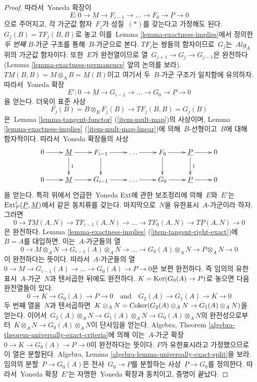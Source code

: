 \begin{proof}
\medskip\noindent
따라서\  Yoneda 확장이
$$
E : 0 \to \underline{M} \to F_{i - 1} \to \ldots \to
F_0 \to \underline{P} \to 0
$$
으로 주어지고, 각 가군값 함자\  $F_j$가 성질\  $(*)$를 갖는다고
가정해도 된다. $G_j(B) = TF_j(B, B)$로 놓고 이를\  Lemma
\ref{lemma-exactness-implies}에서 정의한 {\it 두 번째} $B$-가군 구조를
통해\  $B$-가군으로 본다. $TF_j$는 쌍들의 함자이므로\  $G_j$는\ 
$\textit{Alg}_A$ 위의 가군값 함자이다. 또한\  $E$가 완전열이므로
열\  $G_{j + 1} \to G_j \to G_{j - 1}$은 완전하다(Lemma
\ref{lemma-exactness-permanence} 앞의 논의를 보라).
$T\underline{M}(B, B) = M \otimes_A B = \underline{M}(B)$이고 여기서
두\  $B$-가군 구조가 일치함에 유의하자. 따라서\  Yoneda 확장
$$
E' :  0 \to \underline{M} \to G_{i - 1} \to \ldots \to
G_0 \to \underline{P} \to 0
$$
을 얻는다. 더욱이 표준 사상
$$
F_j(B) = B \otimes_B F_j(B) \longrightarrow TF_j(B, B) = G_j(B)
$$
은\  Lemma \ref{lemma-tangent-functor} (\ref{item-mult-map})의 사상이며,
Lemma \ref{lemma-exactness-implies} (\ref{item-mult-map-linear})에 의해\ 
$B$-선형이고\  $B$에 대해 함자적이다. 따라서\  Yoneda 확장들의 사상
$$
\xymatrix{
0 \ar[r] &
\underline{M} \ar[r] \ar[d]^1 &
F_{i - 1} \ar[r] \ar[d] &
\ldots \ar[r] &
F_0 \ar[r] \ar[d] &
\underline{P} \ar[r] \ar[d]^1 & 0 \\
0 \ar[r] &
\underline{M} \ar[r] &
G_{i - 1} \ar[r] &
\ldots \ar[r] &
G_0 \ar[r] &
\underline{P} \ar[r] & 0
}
$$
을 얻는다. 특히 위에서 언급한\  Yoneda Ext에 관한 보조정리에 의해\ 
$E$와\  $E'$는\  $\mathop{\mathrm{Ext}}\nolimits^i_\mathcal{P}(\underline{P}, \underline{M})$에서
같은 동치류를 갖는다. 마지막으로\  $N$을 유한표시\  $A$-가군이라 하자.
그러면
$$
0 \to T\underline{M}(A, N) \to TF_{i - 1}(A, N) \to \ldots \to
TF_0(A, N) \to T\underline{P}(A, N) \to 0
$$
은 완전하다. Lemma \ref{lemma-exactness-implies}
(\ref{item-tangent-right-exact})에\  $B = A$를 대입하면, 이는\  $A$-가군들의
열
$$
0 \to M \otimes_A N \to G_{i - 1}(A) \otimes_A N \to \ldots \to
G_0(A) \otimes_A N \to P \otimes_A N \to 0
$$
이 완전하다는 뜻이다. 따라서\  $A$-가군들의 열\ 
$0 \to M \to G_{i - 1}(A) \to \ldots \to G_0(A) \to P \to 0$은
보편 완전하다. 즉 임의의 유한표시\  $A$-가군\  $N$과 텐서곱한 뒤에도
완전하다. $K = \mathop{\mathrm{Ker}}(G_0(A) \to P)$로 놓으면 다음 완전열들이 있다.
$$
0 \to K \to G_0(A) \to P \to 0
\quad\text{and}\quad
G_2(A) \to G_1(A) \to K \to 0
$$
두 번째 열을\  $N$과 텐서곱하면\ 
$K \otimes_A N = \mathop{\mathrm{Coker}}(G_2(A) \otimes_A N \to G_1(A) \otimes_A N)$을
얻는다. 이어서\ 
$G_2(A) \otimes_A N \to G_1(A) \otimes_A N \to G_0(A) \otimes_A N$의
완전성으로부터\  $K \otimes_A N \to G_0(A) \otimes_A N$이 단사임을
얻는다. Algebra, Theorem
\ref{algebra-theorem-universally-exact-criteria}에 의해 이는\  $A$-가군 확장\ 
$0 \to K \to G_0(A) \to P \to 0$이 완전하다는 뜻이다. $P$가
유한표시라고 가정했으므로 이 열은 분할된다. Algebra, Lemma
\ref{algebra-lemma-universally-exact-split}을 보라. 임의의 분할\ 
$P \to G_0(A)$은 전사\  $G_0 \to \underline{P}$를 분할하는 사상\ 
$\underline{P} \to G_0$를 정의한다. 따라서\  Yoneda 확장\  $E'$는 자명한\ 
Yoneda 확장과 동치이고, 증명이 끝났다.
\end{proof}

